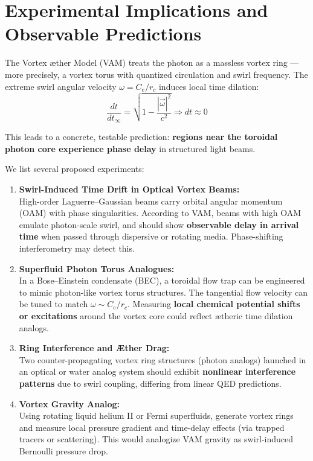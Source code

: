 \section{Experimental Implications and Observable Predictions}

        The Vortex \ae ther Model (VAM) treats the photon as a massless vortex ring — more precisely, a vortex torus with quantized circulation and swirl frequency. The extreme swirl angular velocity \( \omega = C_e / r_c \) induces local time dilation:
        \begin{equation}
            \frac{dt}{dt_\infty} = \sqrt{1 - \frac{|\vec{\omega}|^2}{c^2}} \Rightarrow dt \approx 0
        \end{equation}

        This leads to a concrete, testable prediction: \textbf{regions near the toroidal photon core experience phase delay} in structured light beams.

        We list several proposed experiments:

        \begin{enumerate}
            \item \textbf{Swirl-Induced Time Drift in Optical Vortex Beams:}\\
            High-order Laguerre–Gaussian beams carry orbital angular momentum (OAM) with phase singularities. According to VAM, beams with high OAM emulate photon-scale swirl, and should show \textbf{observable delay in arrival time} when passed through dispersive or rotating media. Phase-shifting interferometry may detect this.

            \item \textbf{Superfluid Photon Torus Analogues:}\\
            In a Bose–Einstein condensate (BEC), a toroidal flow trap can be engineered to mimic photon-like vortex torus structures. The tangential flow velocity can be tuned to match \( \omega \sim C_e / r_c \). Measuring \textbf{local chemical potential shifts or excitations} around the vortex core could reflect ætheric time dilation analogs.

            \item \textbf{Ring Interference and Æther Drag:}\\
            Two counter-propagating vortex ring structures (photon analogs) launched in an optical or water analog system should exhibit \textbf{nonlinear interference patterns} due to swirl coupling, differing from linear QED predictions.

            \item \textbf{Vortex Gravity Analog:}\\
            Using rotating liquid helium II or Fermi superfluids, generate vortex rings and measure local pressure gradient and time-delay effects (via trapped tracers or scattering). This would analogize VAM gravity as swirl-induced Bernoulli pressure drop.
        \end{enumerate}

